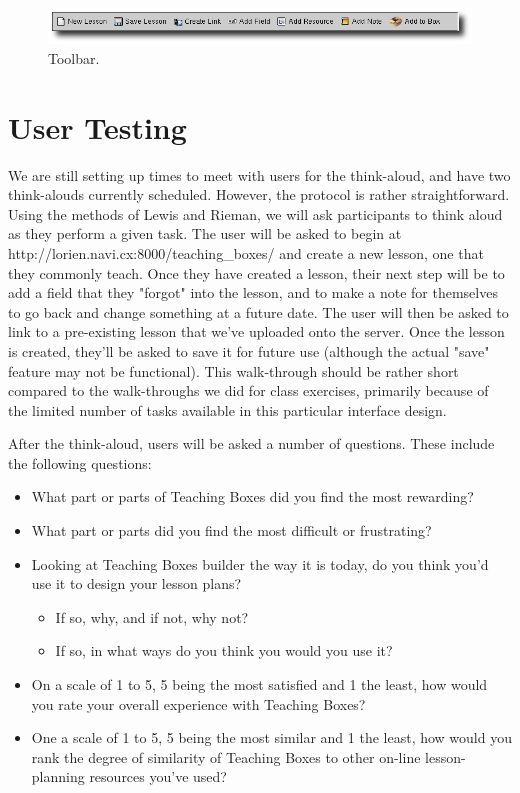 \documentclass[10pt,letter]{article}
\begin{document}
\begin{figure}[htb]
	\centering
	\includegraphics[width=0.9\linewidth]{figures/toolbar}
	\caption{Toolbar.}
	\label{fig: toolbar ss}
\end{figure}

\section{User Testing}
We are still setting up times to meet with users for the think-aloud, and have
two think-alouds currently scheduled.  However, the protocol is rather
straightforward.  Using the methods of Lewis and Rieman, we will ask
participants to think aloud as they perform a given task.  The user will be
asked to begin at http://lorien.navi.cx:8000/teaching\_boxes/ and create a new
lesson, one that they commonly teach.  Once they have created a lesson, their
next step will be to add a field that they "forgot" into the lesson, and to make
a note for themselves to go back and change something at a future date.  The
user will then be asked to link to a pre-existing lesson that we've uploaded
onto the server.  Once the lesson is created, they'll be asked to save it for
future use (although the actual "save" feature may not be functional).  This
walk-through should be rather short compared to the walk-throughs we did for
class exercises, primarily because of the limited number of tasks available in
this particular interface design.

After the think-aloud, users will be asked
a number of questions.  These include the following questions:

\begin{itemize}
\item What part or parts of Teaching Boxes did you find the most rewarding?
\item What part or parts did you find the most difficult or frustrating?
\item Looking at Teaching Boxes builder the way it is today, do you think you'd
      use it to design your lesson plans?
      \begin{itemize}
	  \item If so, why, and if not, why not?
	  \item If so, in what ways do you think you would you use it?
	  \end{itemize}
\item On a scale of 1 to 5, 5 being the most satisfied and 1 the least, how
      would you rate your overall experience with Teaching Boxes?
\item One a scale of 1 to 5, 5 being the most similar and 1 the least, how would
      you rank the degree of similarity of Teaching Boxes to other on-line
      lesson-planning resources you've used?
\end{itemize}
\end{document}
